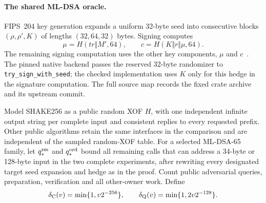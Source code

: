 \documentclass[pdflatex]{sn-jnl}
\theoremstyle{thmstyleone}
\theoremstyle{thmstylethree}
\theoremstyle{thmstyletwo}
\begin{document}
\paragraph{The shared ML-DSA oracle.}
FIPS~204 key generation expands a uniform 32-byte seed into consecutive
blocks $(\rho,\rho',K)$ of lengths $(32,64,32)$ bytes. Signing computes
\[
 \mu=H(\mathit{tr}\Vert M',64),\qquad
 c=H(K\Vert r\Vert\mu,64).
\]
The remaining signing computation uses the other key components, $\mu$
and $c$~\cite{fips204}. The pinned native backend passes the reserved
32-byte randomizer to \texttt{try\_sign\_with\_seed}; the checked implementation
uses $K$ only for this hedge in the signature computation. The full source
map records the fixed crate archive and its upstream commit.

Model SHAKE256 as a public random XOF $H$, with one independent infinite
output string per complete input and consistent replies to every requested
prefix. Other public algorithms retain the same interfaces in the
comparison and are independent of the sampled random-XOF table. For a
selected ML-DSA-65 family, let $q_*^{\rm res}$ and
$q_*^{\rm ord}$ bound all remaining calls that can address a 34-byte or
128-byte input in the two complete experiments, after rewriting every
designated target seed expansion and hedge as in the proof. Count public
adversarial queries, preparation, verification and all other-owner work.
Define
\[
 \delta_{\rm C}(v)=\min\{1,v2^{-256}\},\qquad
 \delta_{\rm Q}(v)=\min\{1,2v2^{-128}\}.
\]
\end{document}
